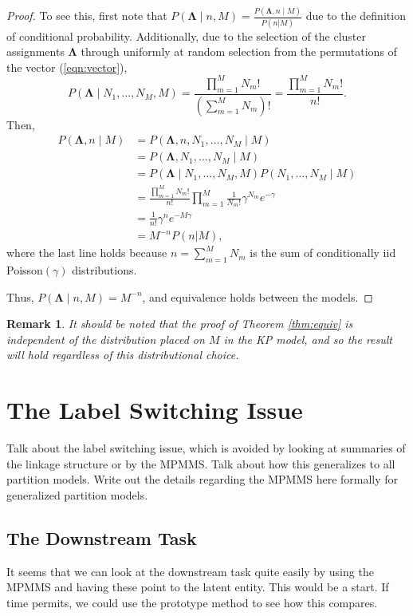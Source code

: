 \documentclass[11pt]{article}
\newtheorem{remark}{Remark}
\begin{document}
\begin{proof}
To see this, first note that $P(\boldsymbol \Lambda \mid n, M) = \frac{P(\boldsymbol \Lambda, n \mid M)}{P(n|M)}$ due to the definition of conditional probability. Additionally, due to the selection of the cluster assignments $\boldsymbol \Lambda$ through uniformly at random selection from the permutations of the vector (\ref{eqn:vector}), 
$$
P(\boldsymbol \Lambda \mid N_1, \dots, N_M, M) = \frac{\prod\limits_{m = 1}^M N_m!}{(\sum\limits_{m = 1}^M N_m)!} = \frac{\prod\limits_{m = 1}^M N_m!}{n!}.
$$
Then,
\begin{align*}
P(\boldsymbol \Lambda, n \mid M) &= P(\boldsymbol \Lambda, n, N_1, \dots, N_M \mid M) \tag{Duplicate information} \\
&= P(\boldsymbol \Lambda, N_1, \dots, N_M \mid M) \tag{Duplicate information} \\
&= P(\boldsymbol \Lambda \mid N_1, \dots, N_M, M)P(N_1, \dots, N_M \mid M) \\
&= \frac{\prod\limits_{m = 1}^M N_m!}{n!} \prod\limits_{m = 1}^M \frac{1}{N_m!} \gamma^{N_m} e^{-\gamma} \\
&= \frac{1}{n!}\gamma^n e^{-M\gamma} \\
&= M^{-n}P(n|M),
\end{align*}
where the last line holds because $n = \sum_{m=1}^M N_m$ is the sum of conditionally iid Poisson$(\gamma)$ distributions.

Thus, $P(\boldsymbol \Lambda \mid n, M) = M^{-n}$, and equivalence holds between the models.
\end{proof}

\begin{remark}
It should be noted that the proof of Theorem \ref{thm:equiv} is independent of the distribution placed on $M$ in the KP model, and so the result will hold regardless of this distributional choice.
\end{remark}

\section{The Label Switching Issue}
Talk about the label switching issue, which is avoided by looking at summaries of the linkage structure or by the MPMMS. 
Talk about how this generalizes to all partition models. 
Write out the details regarding the MPMMS here formally for generalized partition models.

\subsection{The Downstream Task}
It seems that we can look at the downstream task quite easily by using the MPMMS and having these point to the latent entity. 
This would be a start. If time permits, we could use the prototype method to see how this compares. 
\end{document}

